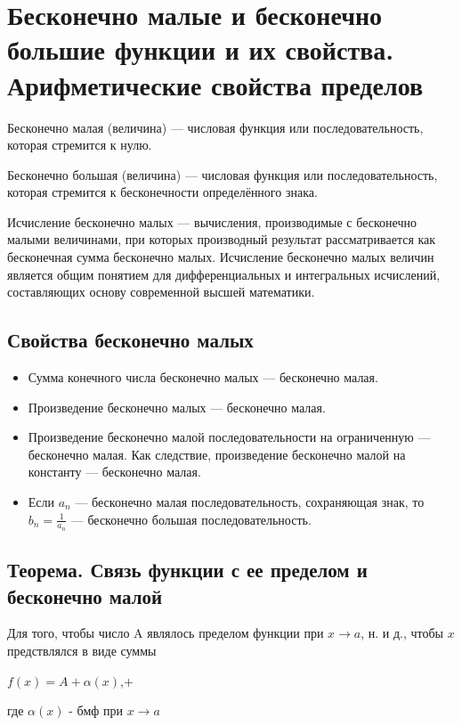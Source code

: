 \section{Бесконечно малые и бесконечно большие функции и их свойства. Арифметические свойства пределов}

Бесконечно малая (величина) — числовая функция или последовательность, которая стремится к нулю.

Бесконечно большая (величина) — числовая функция или последовательность, которая стремится к бесконечности определённого знака.

Исчисление бесконечно малых — вычисления, производимые с бесконечно малыми величинами, при которых производный результат рассматривается как бесконечная сумма бесконечно малых. Исчисление бесконечно малых величин является общим понятием для дифференциальных и интегральных исчислений, составляющих основу современной высшей математики.

\subsection{Свойства бесконечно малых}

\begin{itemize}
\item 
Сумма конечного числа бесконечно малых — бесконечно малая.

\item 
Произведение бесконечно малых — бесконечно малая.

\item 
Произведение бесконечно малой последовательности на ограниченную — бесконечно малая. Как следствие, произведение бесконечно малой на константу — бесконечно малая.

\item 
Если $a_n$ — бесконечно малая последовательность, сохраняющая знак, то $b_n=\frac{1}{a_n}$ — бесконечно большая последовательность.
\end{itemize}


\subsection{Теорема. Связь функции с ее пределом и бесконечно малой}

Для того, чтобы число A являлось пределом функции при $ x \to a $, н. и д., чтобы $ x $ предствлялся в виде суммы

$ f(x) = A + \alpha(x) $,+

где $ \alpha(x) $ - бмф при $ x \to a $

